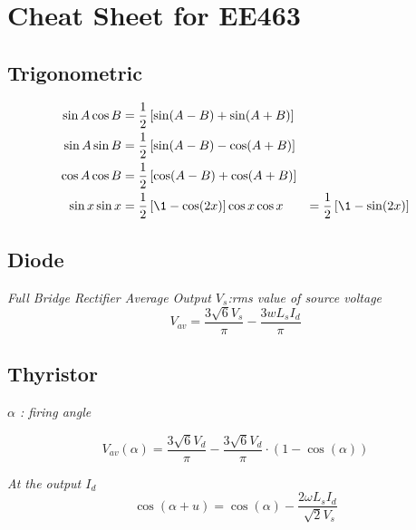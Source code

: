 \documentclass[twocolumn, ]{article}
\begin{document}
\section{\small Cheat Sheet for EE463}

\subsection{ \small Trigonometric }

\begin{align*}
          \sin A \cos B &= \frac{1}{2}\left[ \sin(A-B)+\sin(A+B) \right] \\
          \sin A \sin B &= \frac{1}{2}\left[ \sin(A-B)-\cos(A+B) \right] \\
          \cos A \cos B &= \frac{1}{2}\left[ \cos(A-B)+\cos(A+B) \right] \\ 
	  \sin x \sin x &= \frac{1}{2}\left[ \1 - \cos(2x)  \right]
	  \cos x \cos x &= \frac{1}{2}\left[ \1 - \sin(2x)  \right]
\end{align*}

\subsection{\small Diode}

\textit{Full Bridge Rectifier Average Output $V_{s}$:rms value of source voltage}
\begin{equation*}
 	V_{av}=\frac{3 \sqrt{6} V_{s}}{\pi }-\frac{3wL_{s}I_{d}}{\pi }
\end{equation*}

\subsection{\small Thyristor}
\textit{$\alpha$ : firing angle}

\begin{equation*}
	V_{av}(\alpha)=\frac{3 \sqrt{6} V_{d}}{\pi }-\frac{ 3 \sqrt{6} V_{d}}{\pi }\cdot (1-\cos(\alpha))
\end{equation*}

\textit{At the output $I_{d}$}
\begin{equation*}
	\cos(\alpha + u)=\cos(\alpha)-\dfrac{2\omega L_{s} I_{d}}{\sqrt[]{2}V_{s}}
\end{equation*}
\end{document}
